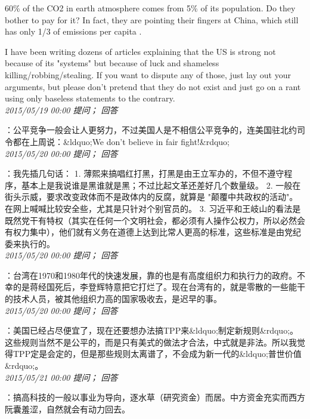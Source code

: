 \documentclass[twocolumn]{ctexart}
\begin{document}
60\% of the CO2 in earth atmosphere comes from 5\% of its population. Do they bother to pay for it? In fact, they are pointing their fingers at China, which still has only 1/3 of emissions per capita .

I have been writing dozens of articles explaining that the US is strong not because of its "systems" but because of luck and shameless killing/robbing/stealing. If you want to dispute any of those, just lay out your arguments, but please don't pretend that they do not exist and just go on a rant using only baseless statements to the contrary.\\

\textit{\hfill\noindent\small 2015/05/19 00:00 提问； 回答}

：公平竞争一般会让人更努力，不过美国人是不相信公平竞争的，连美国驻北约司令都在上周说：\&ldquo;We don't believe in fair fight!\&rdquo;\\

\textit{\hfill\noindent\small 2015/05/20 00:00 提问； 回答}

：我先插几句话：
1. 薄熙来搞唱红打黑，打黑是由王立军办的，不但不遵守程序，基本上是我说谁是黑谁就是黑；不过比起文革还差好几个数量级。
2. 一般在街头示威，要求改变政体而不是政体内的反腐，就算是 "颠覆中共政权的活动"。在网上喊喊比较安全些，尤其是只针对个别官员的。
3. 习近平和王岐山的看法是既然党干有特权（其实在任何一个文明社会，都必须有人操作公权力，所以必然会有权力集中），他们就有义务在道德上达到比常人更高的标准，这些标准是由党纪委来执行的。\\

\textit{\hfill\noindent\small 2015/05/20 00:00 提问； 回答}

：台湾在1970和1980年代的快速发展，靠的也是有高度组织力和执行力的政府。不幸的是蒋经国死后，李登辉特意把它打烂了。现在台湾有的，就是零散的一些能干的技术人员，被其他组织力高的国家吸收去，是迟早的事。\\

\textit{\hfill\noindent\small 2015/05/20 00:00 提问； 回答}

：美国已经占尽便宜了，现在还要想办法搞TPP来\&ldquo;制定新规则\&rdquo;。这些规则当然不是公平的，而是只有美式的做法才合法，中式就是非法。所以我觉得TPP定是会定的，但是那些规则太离谱了，不会成为新一代的\&ldquo;普世价值\&rdquo;。\\

\textit{\hfill\noindent\small 2015/05/21 00:00 提问； 回答}

：搞高科技的一般以事业为导向，逐水草（研究资金）而居。中方资金充实而西方阮囊羞涩，自然就会有动力回去。\\
\end{document}
